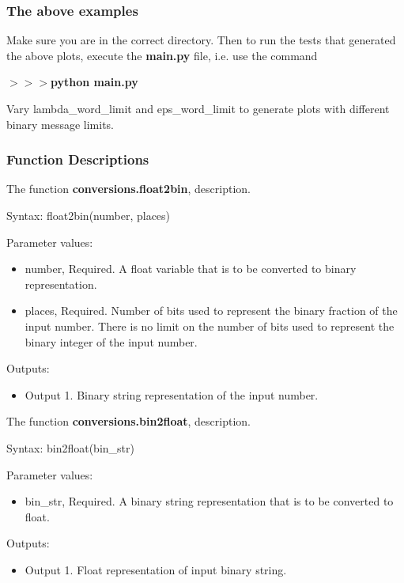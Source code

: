 \documentclass[12pt]{article}
\begin{document}
\subsubsection*{The above examples}

Make sure you are in the correct directory. Then to run the tests that generated the above plots, execute the \textbf{main.py} file, i.e. use the command

\noindent \textbf{$>>>$python main.py}

Vary lambda\_word\_limit and eps\_word\_limit to generate plots with different binary message limits.

\subsubsection*{Function Descriptions}

The function \textbf{conversions.float2bin}, description.

Syntax: float2bin(number, places)

Parameter values:
\begin{itemize}
	\item number, Required. A float variable that is to be converted to binary representation.
	\item places, Required. Number of bits used to represent the binary fraction of the input number. There is no limit on the number of bits used to represent the binary integer of the input number.
\end{itemize}

Outputs:
\begin{itemize}
	\item Output 1. Binary string representation of the input number. 
\end{itemize}

\noindent The function \textbf{conversions.bin2float}, description.

Syntax: bin2float(bin\_str)

Parameter values:
\begin{itemize}
	\item bin\_str, Required. A binary string representation that is to be converted to float.
\end{itemize}

Outputs:
\begin{itemize}
	\item Output 1. Float representation of input binary string. 
\end{itemize}
\end{document}
